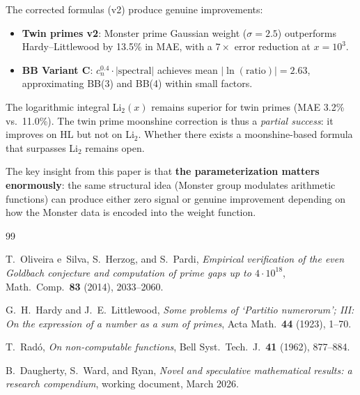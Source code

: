 \documentclass[11pt]{amsart}
\theoremstyle{definition}
\begin{document}
The corrected formulas (v2) produce genuine improvements:
\begin{itemize}
\item \textbf{Twin primes v2}: Monster prime Gaussian weight ($\sigma = 2.5$) outperforms Hardy--Littlewood by 13.5\% in MAE, with a $7\times$ error reduction at $x = 10^3$.
\item \textbf{BB Variant C}: $c_n^{0.4} \cdot |\text{spectral}|$ achieves mean $|\ln(\text{ratio})| = 2.63$, approximating BB(3) and BB(4) within small factors.
\end{itemize}

The logarithmic integral Li$_2(x)$ remains superior for twin primes (MAE 3.2\% vs.\ 11.0\%). The twin prime moonshine correction is thus a \emph{partial success}: it improves on HL but not on Li$_2$. Whether there exists a moonshine-based formula that surpasses Li$_2$ remains open.

The key insight from this paper is that \textbf{the parameterization matters enormously}: the same structural idea (Monster group modulates arithmetic functions) can produce either zero signal or genuine improvement depending on how the Monster data is encoded into the weight function.


\begin{thebibliography}{99}

T.~Oliveira e~Silva, S.~Herzog, and S.~Pardi, \emph{Empirical verification of the even Goldbach conjecture and computation of prime gaps up to $4 \cdot 10^{18}$}, Math.\ Comp.\ \textbf{83} (2014), 2033--2060.

G.~H.~Hardy and J.~E.~Littlewood, \emph{Some problems of `Partitio numerorum'; III: On the expression of a number as a sum of primes}, Acta Math.\ \textbf{44} (1923), 1--70.

T.~Rad\'o, \emph{On non-computable functions}, Bell Syst.\ Tech.\ J.\ \textbf{41} (1962), 877--884.

B.~Daugherty, S.~Ward, and Ryan, \emph{Novel and speculative mathematical results: a research compendium}, working document, March 2026.

\end{thebibliography}
\end{document}
